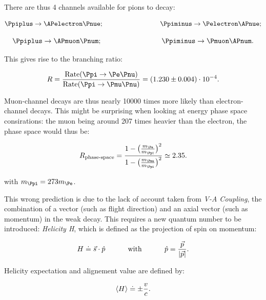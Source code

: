 There are thus 4 channels available for pions to decay:

\begin{equation*}
\Ppiplus \rightarrow \APelectron \Pnue \text{;\hspace{3cm}}\Ppiminus \rightarrow \Pelectron \APnue;
\end{equation*}

\begin{equation*}
\Ppiplus \rightarrow \APmuon \Pnum \text{;\hspace{3cm}}\Ppiminus \rightarrow \Pmuon \APnum.
\end{equation*}

This gives rise to the branching ratio:

\begin{equation}
R=\frac{\text{Rate}(\Ppi\rightarrow \Pe \Pnu)}{\text{Rate}(\Ppi\rightarrow \Pmu \Pnu)} = (1.230 \pm 0.004) \cdot 10^{-4}.
\end{equation}

Muon-channel decays are thus nearly 10000 times more likely than electron-channel decays. This might be surprising when looking at energy phase space consirations: the muon being around 207 times heavier than the electron, the phase space would thus be:

\begin{equation}
R_{\text{phase-space}}=\frac{1-\big(\frac{m_{\Pe}}{m_{\Ppi}}\big)^2}{1-\big(\frac{m_{\Pmu}}{m_{\Ppi}}\big)^2} \simeq 2.35.
\end{equation}

with $m_{\Ppi} = 273 m_{\Pe}$.

This wrong prediction is due to the lack of account taken from \textit{V-A Coupling}, the combination of a vector (such as flight direction) and an axial vector (such as momentum) in the weak decay. This requires a new quantum number to be introduced: \textit{Helicity H}, which is defined as the projection of spin on momentum:

\begin{equation*}
H\doteq \vec{s}\cdot \hat{p} \text{\hspace {1cm} with \hspace{1cm}} \hat{p}=\frac{\vec{p}}{|\vec{p}|}.
\end{equation*}

Helicity  expectation and alignement value are defined by:

\begin{equation*}
\Braket{H}\doteq\pm\frac{v}{c}.
\end{equation*}

